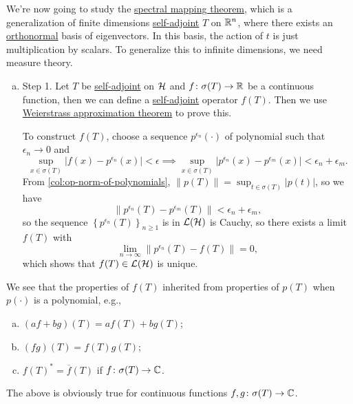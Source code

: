 We're now going to study the \hyperref[thm:spectral-mapping]{spectral mapping theorem}, which is a generalization of finite dimensions \hyperref[def:self-adjoint-op]{self-adjoint} \(T\) on \(\mathbb{\MakeUppercase{r}} ^n\), where there exists an \hyperref[def:orthonormal-system]{orthonormal} basis of eigenvectors. In this basis, the action of \(t\) is just multiplication by scalars. To generalize this to infinite dimensions, we need measure theory.

\begin{enumerate}[(a)]
	\item Step 1. Let \(T\) be \hyperref[def:self-adjoint-op]{self-adjoint} on \(\mathcal{\MakeUppercase{h}} \) and \(f\colon \sigma (T) \to \mathbb{\MakeUppercase{r}} \) be a continuous function, then we can define a \hyperref[def:self-adjoint-op]{self-adjoint} operator \(f(T)\). Then we use \hyperref[thm:Weierstrass-approximation]{Weierstrass approximation theorem} to prove this.

	      To construct \(f(T)\), choose a sequence \(p^{\epsilon _n}(\cdot)\) of polynomial such that \(\epsilon _n \to 0\) and
	      \[
		      \sup _{x\in \sigma (T)} \vert f(x) - p^{\epsilon _n}(x)  \vert < \epsilon
		      \implies \sup _{x\in \sigma (T)} \vert p^{\epsilon _n}(x) - p^{\epsilon _m}(x) \vert < \epsilon _n + \epsilon _m.
	      \]
	      From \autoref{col:op-norm-of-polynomials}, \(\lVert p(T) \rVert = \sup _{t\in \sigma (T)} \vert p(t) \vert \), so we have
	      \[
		      \lVert p^{\epsilon _n}(T) - p^{\epsilon _m}(T) \rVert < \epsilon _n + \epsilon _m,
	      \]
	      so the sequence \(\left\{ p^{\epsilon _n}(T) \right\} _{n\geq 1}\) is in \(\mathcal{\MakeUppercase{l}} (\mathcal{\MakeUppercase{h}} )\) is Cauchy, so there exists a limit \(f(T)\) with
	      \[
		      \lim_{n \to \infty} \lVert p^{\epsilon _n}(T) - f(T) \rVert = 0,
	      \]
	      which shows that \(f(T)\in \mathcal{\MakeUppercase{l}} (\mathcal{\MakeUppercase{h}} )\) is unique.
\end{enumerate}

We see that the properties of \(f(T)\) inherited from properties of \(p(T)\) when \(p(\cdot)\) is a polynomial, e.g.,
\begin{enumerate}[(a)]
	\item \((af + bg)(T) = af(T) + bg(T)\);
	\item \((fg)(T) = f(T) g(T)\);
	\item \(f(T)^{\ast} = \overline{f} (T)\) if \(f\colon \sigma (T) \to \mathbb{\MakeUppercase{c}}\).
\end{enumerate}
The above is obviously true for continuous functions \(f, g\colon \sigma (T) \to \mathbb{\MakeUppercase{c}} \).

